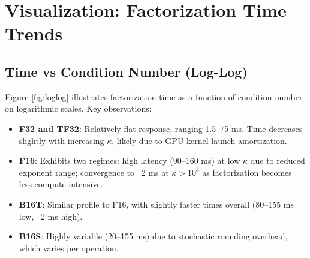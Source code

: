 \documentclass[11pt,a4paper]{article}
\begin{document}
\section{Visualization: Factorization Time Trends}

\subsection{Time vs Condition Number (Log-Log)}

Figure \ref{fig:loglog} illustrates factorization time as a function of condition number on logarithmic scales. Key observations:

\begin{itemize}
  \item \textbf{F32 and TF32}: Relatively flat response, ranging 1.5--75 ms. Time decreases slightly with increasing $\kappa$, likely due to GPU kernel launch amortization.
  \item \textbf{F16}: Exhibits two regimes: high latency (90--160 ms) at low $\kappa$ due to reduced exponent range; convergence to ~2 ms at $\kappa > 10^3$ as factorization becomes less compute-intensive.
  \item \textbf{B16T}: Similar profile to F16, with slightly faster times overall (80--155 ms low, ~2 ms high).
  \item \textbf{B16S}: Highly variable (20--155 ms) due to stochastic rounding overhead, which varies per operation.
\end{itemize}
\end{document}

